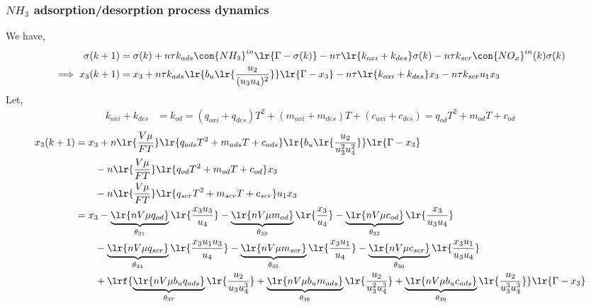 \subsubsection{$NH_3$ adsorption/desorption process dynamics}
We have,
\begin{align*}
        \sigma(k + 1) &= \sigma(k)
        + n\tau k_{ads} \con{NH_3}^{in} \lr{\Gamma - \sigma(k)}
        - n \tau \lr{k_{oxi} + k_{des}} \sigma(k)
        - n \tau k_{scr} \con{NO_x}^{in}(k) \sigma(k) \\
        \implies x_3(k+1) &= x_3
                + n\tau k_{ads} \lr{b_u \lr{\frac{u_2}{(u_3 u_4)^2}}} \lr{\Gamma - x_3}
                - n \tau \lr{k_{oxi} + k_{des}} x_3
                - n \tau k_{scr} u_1 x_3
\end{align*}
Let,
\begin{align*}
        k_{oxi} + k_{des} &= k_{od} = (q_{oxi} + q_{des})T^2 + (m_{oxi} + m_{des}) T + (c_{oxi} + c_{des}) = q_{od} T^2 + m_{od} T + c_{od}
\end{align*}
\begin{align*}
        x_3(k+1) &= x_3
                + n \lr{\frac{V \mu}{FT}} \lr{q_{ads} T^2 + m_{ads} T + c_{ads}} \lr{b_u \lr{\frac{u_2}{u_3^2 u_4^2}}} \lr{\Gamma - x_3} \\
                & \qquad - n \lr{\frac{V \mu}{FT}} \lr{q_{od} T^2 + m_{od} T + c_{od}} x_3 \\
                & \qquad - n \lr{\frac{V \mu}{FT}} \lr{q_{scr} T^2 + m_{scr} T + c_{scr}} u_1 x_3\\
                &= x_3 - \underbrace{\lr{n V \mu q_{od}}}_{\theta_{31}} \lr{\frac{x_3 u_3}{u_4}}
                       - \underbrace{\lr{n V \mu m_{od}}}_{\theta_{32}} \lr{\frac{x_3}{u_4}}
                       - \underbrace{\lr{n V \mu c_{od}}}_{\theta_{33}} \lr{\frac{x_3}{u_3 u_4}} \\
                & \qquad - \underbrace{\lr{n V \mu q_{scr}}}_{\theta_{34}} \lr{\frac{x_3 u_1 u_3}{u_4}}
                         - \underbrace{\lr{n V \mu m_{scr}}}_{ \theta_{35}}\lr{\frac{x_3 u_1}{u_4}}
                         - \underbrace{\lr{n V \mu c_{scr}}}_{\theta_{36}} \lr{\frac{x_3 u_1}{u_3 u_4}} \\
                & \qquad +\lrf{ \underbrace{\lr{n V \mu b_u q_{ads}} }_{\theta_{37}}\lr{\frac{u_2}{u_3 u_4^3}}
                              + \underbrace{\lr{n V \mu b_u m_{ads}} }_{\theta_{38}}\lr{\frac{u_2}{u_3^2 u_4^3}}
                              + \underbrace{\lr{n V \mu b_u c_{ads}} }_{\theta_{39}}\lr{\frac{u_2}{u_3^3 u_4^3}} } \lr{\Gamma - x_3}
\end{align*}
